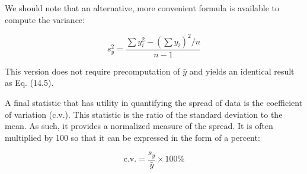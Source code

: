 \documentclass[../main.tex]{subfiles}
\begin{document}
We should note that an alternative, more convenient formula is available to compute
the variance:

\begin{equation}
	\tag{14.6}
	s^2_y = \frac{\sum y_i^2 -(\sum y_i)^2 / n}{n-1}
\end{equation}

\noindent This version does not require precomputation of $\bar{y}$ and yields an identical result as Eq. (14.5).

A final statistic that has utility in quantifying the spread of data is the coefficient of
variation (c.v.). This statistic is the ratio of the standard deviation to the mean. As such, it
provides a normalized measure of the spread. It is often multiplied by 100 so that it can be
expressed in the form of a percent:

\begin{equation}
	\tag{14.7}
	\text{c.v.} = \frac{s_y}{\bar{y}} \times 100\%
\end{equation}
\end{document}
